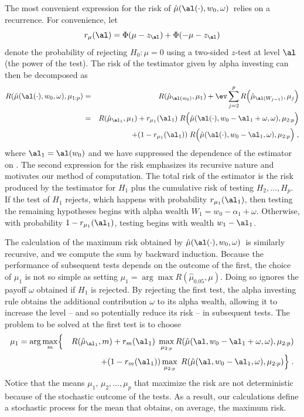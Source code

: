 \documentclass[12pt]{article}
\newcommand{\test}{\mbox{$\hat\mu(\al(\cdot),w_0,\omega)$}}
\begin{document}
 The most convenient expression for the risk of \test\ relies on a recurrence.
  For convenience, let
 \begin{equation}
   r_\mu(\al) = \Phi(\mu-z_\al)+\Phi(-\mu-z_\al)   
 \label{eq:rMu}
 \end{equation}
 denote the probability of rejecting $H_0: \mu=0$ using a two-sided $z$-test at
 level $\al$ (the power of the test).  The risk of the testimator given by alpha
 investing can then be decomposed as
 \begin{eqnarray}
   R(\hat\mu(\al(\cdot),w_0,\omega),\mu_{1:p}) 
    &=& R(\hat\mu_{\al(w_0)},\mu_1)
        + \ev \sum_{j=2}^p R\Bigl(\hat\mu_{\al(W_{j-1})},\mu_j\Bigr)  \cr
    &=& R(\hat\mu_{\al_1},\mu_1)
        + r_{\mu_1}(\al_1)\; 
          R\Bigl(\hat\mu(\al(\cdot),w_0-\al_1+\omega,\omega),\mu_{2:p}\Bigr)\cr
    & & \qquad + (1-r_{\mu_1}(\al_1))\; 
          R\Bigl(\hat\mu(\al(\cdot),w_0-\al_1,\omega),\mu_{2:p}\Bigr) \;,
 \label{eq:RMuHat}
 \end{eqnarray}
 where $\al_1 = \al(w_0)$ and we have suppressed the dependence of the estimator
 on \YY.  The second expression for the risk emphasizes its recursive nature and
 motivates our method of computation.  The total risk of the estimator is the
 risk produced by the testimator for $H_1$ plus the cumulative risk of testing
 $H_2, \ldots, H_p$.  If the test of $H_1$ rejects, which happens with
 probability $r_{\mu_1}(\al_1)$, then testing the remaining hypotheses begins
 with alpha wealth $W_1 = w_0 - \alpha_1 + \omega$.  Otherwise, with probability
 $1- r_{\mu_1}(\al_1)$, testing begins with wealth $w_1 - \al_1$.


 The calculation of the maximum risk obtained by \test\ is similarly recursive,
 and we compute the sum by backward induction.  Because the performance of
 subsequent tests depends on the outcome of the first, the choice of $\mu_1$ is
 not so simple as setting $\mu_1 = \arg \max R(\hat\mu_{0.05}, \mu)$.  Doing so
 ignores the payoff $\omega$ obtained if $H_1$ is rejected.  By rejecting the
 first test, the alpha investing rule obtains the additional contribution
 $\omega$ to its alpha wealth, allowing it to increase the level -- and so
 potentially reduce its risk -- in subsequent tests.  The problem to be solved
 at the first test is to choose
 \begin{eqnarray*}
    \mu_1 = \arg \max_{m} & \Bigl\{ & R(\hat\mu_{\al_1},m) \Bigr. 
        + r_{m}(\al_1) \; \max_{\mu_{2:p}} 
              R(\hat\mu(\al,w_0-\al_1+\omega,\omega),\mu_{2:p})\cr
    & & + \Bigl. (1-r_{m}(\al_1)) \max_{\mu_{2:p}} \; 
              R(\hat\mu(\al,w_0-\al_1,\omega),\mu_{2:p}) \Bigr\} \;.
 \end{eqnarray*}
 Notice that the means $\mu_1,\, \mu_2,\ldots, \mu_p$ that maximize the risk are
 not deterministic because of the stochastic outcome of the tests.  As a result,
 our calculations define a stochastic process for the mean that obtains, on
 average, the maximum risk.
\end{document}
